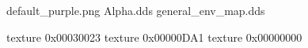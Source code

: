 default_purple.png
Alpha.dds
general_env_map.dds

texture 0x00030023
texture 0x00000DA1
texture 0x00000000

